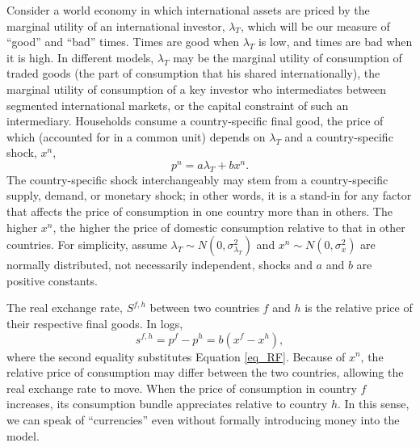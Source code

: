 \documentclass{ar-1col}
\begin{document}
Consider a world economy in which international assets are priced by
the marginal utility of an international investor, $\lambda_T$, which
will be our measure of ``good'' and ``bad'' times. Times are good when
$\lambda_T$ is low, and times are bad when it is high. In different
models, $\lambda_T$ may be the marginal utility of consumption of
traded goods (the part of consumption that his shared
internationally), the marginal utility of consumption of a key
investor who intermediates between segmented international markets, or
the capital constraint of such an intermediary. Households consume a
country-specific final good, the price of which (accounted for in a
common unit) depends on $\lambda_T$ and a country-specific shock,
$x^n$,
\begin{equation}
  p^{n} = a\lambda_{T} + b x^{n}.  
  \label{eq_RF}
\end{equation}%
The country-specific shock interchangeably may stem from a
country-specific supply, demand, or monetary shock; in other words, it
is a stand-in for any factor that affects the price of consumption in
one country more than in others. The higher $x^{n}$, the higher the
price of domestic consumption relative to that in other countries. For
simplicity, assume $\lambda _{T}\sim N(0,\sigma^2_{\lambda_{T}})$ and
$x^{n} \sim N(0,\sigma^2_x) $ are normally distributed, not
necessarily independent, shocks and $a$ and $b$ are positive constants.

The real exchange rate, $S^{f, h}$ between two countries $f$ and $h$ 
is the relative price of their respective final goods. In logs,
\begin{equation}
  s^{f,h} 
  = p^f - p^h 
  = b(x^f - x^h),
\label{eq_RER}
\end{equation}
where the second equality substitutes Equation \eqref{eq_RF}. Because 
of $x^{n}$, the relative price of consumption may differ between the 
two countries, allowing the real exchange rate to move. When the price of
consumption in country $f$ increases, its consumption bundle
appreciates relative to country $h$. In this sense, we can speak of
``currencies'' even without formally introducing money into the model.
\end{document}
